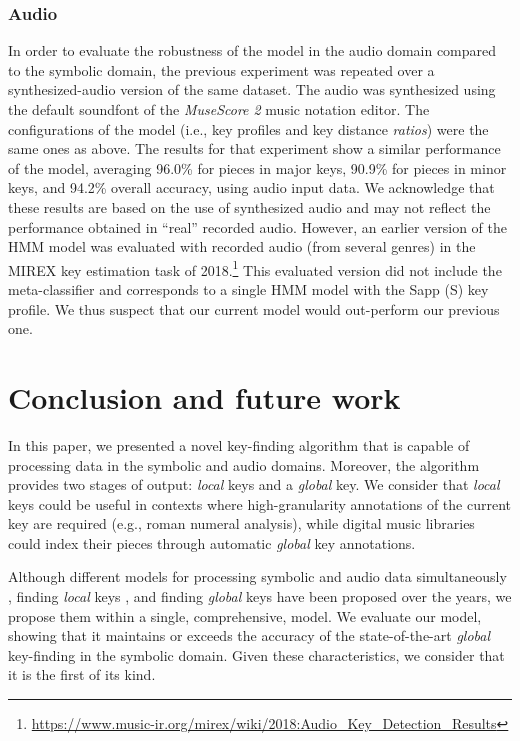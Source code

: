 \documentclass[sigconf]{acmart}
\begin{document}
\subsubsection{Audio}
In order to evaluate the robustness of the model in the audio domain compared to the symbolic domain, the previous experiment was repeated over a synthesized-audio version of the same dataset. The audio was synthesized using the default soundfont of the \emph{MuseScore 2} music notation editor. The configurations of the model (i.e., key profiles and key distance \emph{ratios}) were the same ones as above. The results for that experiment show a similar performance of the model, averaging 96.0\% for pieces in major keys, 90.9\% for pieces in minor keys, and 94.2\% overall accuracy, using audio input data. We acknowledge that these results are based on the use of synthesized audio and may not reflect the performance obtained in ``real'' recorded audio. However, an earlier version of the HMM model was evaluated with recorded audio (from several genres) in the MIREX key estimation task of 2018.\footnote{\url{https://www.music-ir.org/mirex/wiki/2018:Audio_Key_Detection_Results}} This evaluated version did not include the meta-classifier and corresponds to a single HMM model with the Sapp (S) key profile. We thus suspect that our current model would out-perform our previous one.

\section{Conclusion and future work}
In this paper, we presented a novel key-finding algorithm that is capable of processing data in the symbolic and audio domains. Moreover, the algorithm  provides two stages of output: \emph{local} keys and a \emph{global} key. We consider that \emph{local} keys could be useful in contexts where high-granularity annotations of the current key are required (e.g., roman numeral analysis), while digital music libraries could index their 
pieces through automatic \emph{global} key annotations.

Although different models for processing symbolic and audio data simultaneously \cite{pickens2003, toiviainen2007visualization, tzanetakis2002pitch, collins2014bridging}, finding \emph{local} keys \cite{papadopoulos2009}, and finding \emph{global} keys \cite{albrecht2013use, korzeniowski017} have been proposed over the years, we propose them within a single, comprehensive, model. We evaluate our model, showing that it maintains or exceeds the accuracy of the state-of-the-art \emph{global} key-finding in the symbolic domain. Given these characteristics, we consider that it is the first of its kind. 
\end{document}
